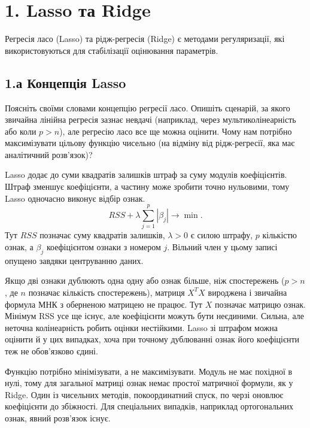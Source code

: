 \section{1. Lasso та Ridge}


Регресія ласо (Lasso) та рідж-регресія (Ridge) є методами регуляризації,
які використовуються для стабілізації оцінювання параметрів.


\Needspace{167pt}

\subsection{1.а Концепція Lasso}

\begin{taskstatement}Поясніть своїми словами концепцію регресії ласо. Опишіть сценарій, за
якого звичайна лінійна регресія зазнає невдачі (наприклад, через
мультиколінеарність або коли \(p > n\)), але регресію ласо все ще можна
оцінити. Чому нам потрібно максимізувати цільову функцію чисельно (на
відміну від рідж-регресії, яка має аналітичний розв'язок)?
\end{taskstatement}

\par\medskip
Lasso додає до суми квадратів залишків штраф за суму модулів
коефіцієнтів. Штраф зменшує коефіцієнти, а частину може зробити точно
нульовими, тому Lasso одночасно виконує відбір ознак.
\[RSS+\lambda\sum_{j=1}^{p}|\beta_j|\longrightarrow\min.\] Тут \(RSS\)
позначає суму квадратів залишків, \(\lambda>0\) є силою штрафу, \(p\)
кількістю ознак, а \(\beta_j\) коефіцієнтом ознаки з номером \(j\).
Вільний член у цьому записі опущено завдяки центруванню даних.

Якщо дві ознаки дублюють одна одну або ознак більше, ніж спостережень
(\(p>n\), де \(n\) позначає кількість спостережень), матриця \(X^TX\)
вироджена і звичайна формула МНК з оберненою матрицею не працює. Тут
\(X\) позначає матрицю ознак. Мінімум RSS усе ще існує, але коефіцієнти
можуть бути неєдиними. Сильна, але неточна колінеарність робить оцінки
нестійкими. Lasso зі штрафом можна оцінити й у цих випадках, хоча при
точному дублюванні ознак його коефіцієнти теж не обов'язково єдині.

Функцію потрібно мінімізувати, а не максимізувати. Модуль не має
похідної в нулі, тому для загальної матриці ознак немає простої
матричної формули, як у Ridge. Один із чисельних методів, покоординатний
спуск, по черзі оновлює коефіцієнти до збіжності. Для спеціальних
випадків, наприклад ортогональних ознак, явний розв'язок існує.


